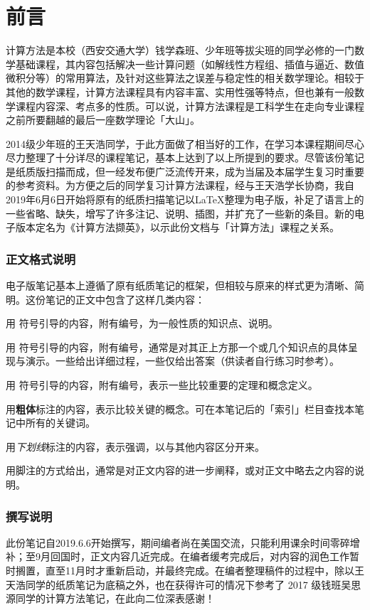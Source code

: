 \chapter*{前言}
计算方法是本校（西安交通大学）钱学森班、少年班等拔尖班的同学必修的一门数学基础课程，其内容包括解决一些计算问题（如解线性方程组、插值与逼近、数值微积分等）的常用算法，及针对这些算法之误差与稳定性的相关数学理论。相较于其他的数学课程，计算方法课程具有内容丰富、实用性强等特点，但也兼有一般数学课程内容深、考点多的性质。可以说，计算方法课程是工科学生在走向专业课程之前所要翻越的最后一座数学理论「大山」。

2014级少年班的王天浩同学，于此方面做了相当好的工作，在学习本课程期间尽心尽力整理了十分详尽的课程笔记，基本上达到了以上所提到的要求。尽管该份笔记是纸质版扫描而成，但一经发布便广泛流传开来，成为当届及本届学生复习时重要的参考资料。为方便之后的同学复习计算方法课程，经与王天浩学长协商，我自2019年6月6日开始将原有的纸质扫描笔记以\LaTeX 整理为电子版，补足了语言上的一些省略、缺失，增写了许多注记、说明、插图，并扩充了一些新的条目。新的电子版本定名为《计算方法撷英》，以示此份文档与「计算方法」课程之关系。

\subsection*{正文格式说明}
电子版笔记基本上遵循了原有纸质笔记的框架，但相较与原来的样式更为清晰、简明。这份笔记的正文中包含了这样几类内容：
\begin{description}\tl
    \item[条目] 用  符号引导的内容，附有编号，为一般性质的知识点、说明。
    \item[例题] 用  符号引导的内容，附有编号，通常是对其正上方那一个或几个知识点的具体呈现与演示。一些给出详细过程，一些仅给出答案（供读者自行练习时参考）。
    \item[定理/定义] 用  符号引导的内容，附有编号，表示一些比较重要的定理和概念定义。
    \item[关键词] 用\textbf{粗体}标注的内容，表示比较关键的概念。可在本笔记后的「索引」栏目查找本笔记中所有的关键词。 
    \item[强调] 用\emph{下划线}标注的内容，表示强调，以与其他内容区分开来。 
    \item[注记] 用脚注的方式给出，通常是对正文内容的进一步阐释，或对正文中略去之内容的说明。
\end{description}

\subsection*{撰写说明}
此份笔记自2019.6.6开始撰写，期间编者尚在美国交流，只能利用课余时间零碎增补；至9月回国时，正文内容几近完成。在编者缓考完成后，对内容的润色工作暂时搁置，直至11月时才重新启动，并最终完成。在编者整理稿件的过程中，除以王天浩同学的纸质笔记为底稿之外，也在获得许可的情况下参考了 2017 级钱班吴思源同学的计算方法笔记，在此向二位深表感谢！


